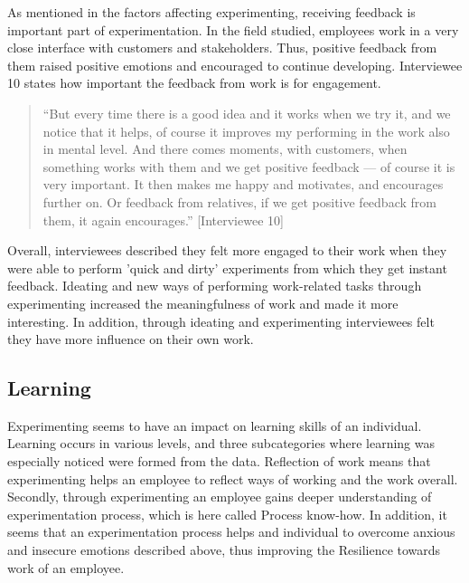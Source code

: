  As mentioned in the factors affecting experimenting, receiving feedback is important part of experimentation. In the field studied, employees work in a very close interface with customers and stakeholders. Thus, positive feedback from them raised positive emotions and encouraged to continue developing. Interviewee 10 states how important the feedback from work is for engagement.
\begin{quote}
``But every time there is a good idea and it works when we try it, and we notice that it helps, of course it improves my performing in the work also in mental level. And there comes moments, with customers, when something works with them and we get positive feedback --- of course it is very important. It then makes me happy and motivates, and encourages further on. Or feedback from relatives, if we get positive feedback from them, it again encourages.'' [Interviewee 10]
\end{quote}
Overall, interviewees described they felt more engaged to their work when they were able to perform 'quick and dirty' experiments from which they get instant feedback. Ideating and new ways of performing work-related tasks through experimenting increased the meaningfulness of work and made it more interesting. In addition, through ideating and experimenting interviewees felt they have more influence on their own work.

\subsection{Learning}
Experimenting seems to have an impact on learning skills of an individual. Learning occurs in various levels, and three subcategories where learning was especially noticed were formed from the data. Reflection of work means that experimenting helps an employee to reflect ways of working and the work overall. Secondly, through experimenting an employee gains deeper understanding of experimentation process, which is here called Process know-how.  In addition, it seems that an experimentation process helps and individual to overcome anxious and insecure emotions described above, thus improving the Resilience towards work of an employee. 

